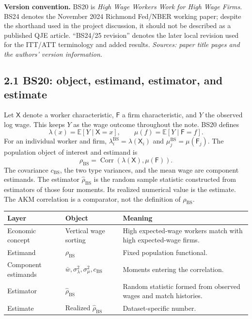 \documentclass[11pt]{article}
\begin{document}
\textbf{Version convention.}
BS20 is \emph{High Wage Workers Work for High Wage Firms}.  BS24 denotes the
November 2024 Richmond Fed/NBER working paper; despite the shorthand used in
the project discussion, it should not be described as a published QJE
article.  ``BS24/25 revision'' denotes the later local revision used for the
ITT/ATT terminology and added results.
\textit{Sources: paper title pages and the authors' version information.}

\subsection{2.1 BS20: object, estimand, estimator, and estimate}

Let \(\mathsf X\) denote a worker characteristic, \(\mathsf F\) a firm
characteristic, and
\(Y\) the observed log wage.  This keeps \(Y\) as the wage outcome throughout
the note.  BS20 defines
\[
\lambda(x)=\mathbb E[Y\mid \mathsf X=x],
\qquad
\mu(f)=\mathbb E[Y\mid \mathsf F=f].
\tag{T2.1}
\]
For an individual worker and firm,
\(\lambda_i^{\mathrm{BS}}=\lambda(\mathsf X_i)\) and
\(\mu_j^{\mathrm{BS}}=\mu(\mathsf F_j)\).
The population object of interest and estimand is
\[
\rho_{\mathrm{BS}}
=
\operatorname{Corr}(\lambda(\mathsf X),\mu(\mathsf F)).
\tag{T2.2}
\]
The covariance \(c_{\mathrm{BS}}\), the two type variances, and the mean wage
are component estimands.  The estimator
\(\widehat\rho_{\mathrm{BS}}\) is the random sample statistic constructed
from estimators of those four moments.  Its realized numerical value is the
estimate.  The AKM correlation is a comparator, not the definition of
\(\rho_{\mathrm{BS}}\).

\begin{longtable}{p{}p{}p{}}
\textbf{Layer} & \textbf{Object} & \textbf{Meaning} \\
\hline
Economic concept & Vertical wage sorting & High expected-wage workers match
with high expected-wage firms. \\
Estimand & \(\rho_{\mathrm{BS}}\) & Fixed population functional. \\
Component estimands & \(\bar w,\sigma_\lambda^2,\sigma_\mu^2,c_{\mathrm{BS}}\)
& Moments entering the correlation. \\
Estimator & \(\widehat\rho_{\mathrm{BS}}\) & Random statistic formed from
observed wages and match histories. \\
Estimate & Realized \(\widehat\rho_{\mathrm{BS}}\) & Dataset-specific number. \\
\end{longtable}
\end{document}
